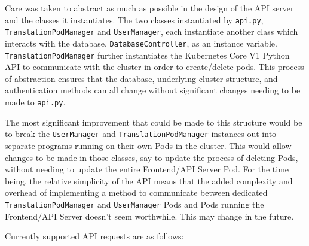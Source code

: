 \documentclass[12pt]{article}
\begin{document}
Care was taken to abstract as much as possible in the design of the
API server and the classes it instantiates.  The two classes
instantiated by \lstinline{api.py}, \lstinline{TranslationPodManager}
and \lstinline{UserManager}, each instantiate another class which
interacts with the database, \lstinline{DatabaseController}, as an
instance variable.  \lstinline{TranslationPodManager} further
instantiates the Kubernetes Core V1 Python API to communicate with the
cluster in order to create/delete pods.  This process of abstraction
ensures that the database, underlying cluster structure, and
authentication methods can all change without significant changes
needing to be made to \lstinline{api.py}.
\par

The most significant improvement that could be made to this structure
would be to break the \lstinline{UserManager} and
\lstinline{TranslationPodManager} instances out into separate programs
running on their own Pods in the cluster.  This would allow changes to
be made in those classes, say to update the process of deleting Pods,
without needing to update the entire Frontend/API Server Pod.  For the
time being, the relative simplicity of the API means that the added
complexity and overhead of implementing a method to communicate
between dedicated \lstinline{TranslationPodManager} and
\lstinline{UserManager} Pods and Pods running the Frontend/API Server
doesn't seem worthwhile.  This may change in the future.
\par

Currently supported API requests are as follows:
\end{document}
